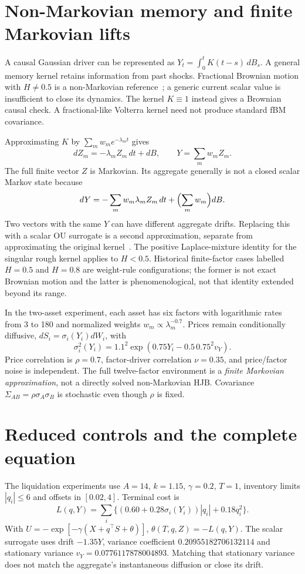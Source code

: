 \section{Non-Markovian memory and finite Markovian lifts}
A causal Gaussian driver can be represented as $Y_t=\int_0^t K(t-s)\,dB_s$. A general memory kernel retains information from past shocks. Fractional Brownian motion with $H\ne0.5$ is a non-Markovian reference~\cite{MandelbrotVanNess1968}; a generic current scalar value is insufficient to close its dynamics. The kernel $K\equiv1$ instead gives a Brownian causal check. A fractional-like Volterra kernel need not produce standard fBM covariance.

Approximating $K$ by $\sum_m w_me^{-\lambda_m t}$ gives
\[
dZ_m=-\lambda_mZ_m\,dt+dB,\qquad Y=\sum_mw_mZ_m.
\]
The full finite vector $Z$ is Markovian. Its aggregate generally is not a closed scalar Markov state because
\[
dY=-\sum_mw_m\lambda_mZ_m\,dt+\Bigl(\sum_mw_m\Bigr)dB.
\]
Two vectors with the same $Y$ can have different aggregate drifts. Replacing this with a scalar OU surrogate is a second approximation, separate from approximating the original kernel~\cite{AbiJaberElEuch2019,hft2}. The positive Laplace-mixture identity for the singular rough kernel applies to $H<0.5$. Historical finite-factor cases labelled $H=0.5$ and $H=0.8$ are weight-rule configurations; the former is not exact Brownian motion and the latter is phenomenological, not that identity extended beyond its range.

In the two-asset experiment, each asset has six factors with logarithmic rates from 3 to 180 and normalized weights $w_m\propto\lambda_m^{-0.7}$. Prices remain conditionally diffusive, $dS_i=\sigma_i(Y_i)dW_i$, with
\[
\sigma_i^2(Y_i)=1.1^2\exp(0.75Y_i-0.5\,0.75^2v_Y).
\]
Price correlation is $\rho=0.7$, factor-driver correlation $\nu=0.35$, and price/factor noise is independent. The full twelve-factor environment is a \emph{finite Markovian approximation}, not a directly solved non-Markovian HJB. Covariance $\Sigma_{AB}=\rho\sigma_A\sigma_B$ is stochastic even though $\rho$ is fixed.

\section{Reduced controls and the complete equation}
The liquidation experiments use $A=14$, $k=1.15$, $\gamma=0.2$, $T=1$, inventory limits $|q_i|\le6$ and offsets in $[0.02,4]$. Terminal cost is
\[
L(q,Y)=\sum_i\{(0.60+0.28\sigma_i(Y_i))|q_i|+0.18q_i^2\}.
\]
With $U=-\exp[-\gamma(X+q^\top S+\theta)]$, $\theta(T,q,Z)=-L(q,Y)$. The scalar surrogate uses drift $-1.35Y$, variance coefficient $0.20955182706132114$ and stationary variance $v_Y=0.0776117878004893$. Matching that stationary variance does not match the aggregate's instantaneous diffusion or close its drift.


